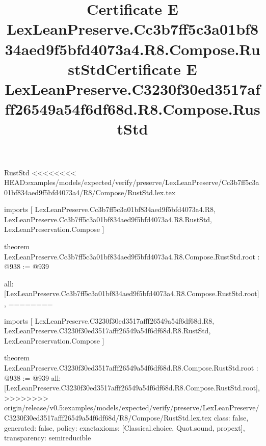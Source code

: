 \begin{lexlean}{RustStd}
<<<<<<<< HEAD:examples/models/expected/verify/preserve/LexLeanPreserve/Cc3b7ff5c3a01bf834aed9f5bfd4073a4/R8/Compose/RustStd.lex.tex
\title{Certificate E LexLeanPreserve.Cc3b7ff5c3a01bf834aed9f5bfd4073a4.R8.Compose.RustStd}
\begin{coremodule}
imports [
  LexLeanPreserve.Cc3b7ff5c3a01bf834aed9f5bfd4073a4.R8,
  LexLeanPreserve.Cc3b7ff5c3a01bf834aed9f5bfd4073a4.R8.RustStd,
  LexLeanPreservation.Compose
]

theorem LexLeanPreserve.Cc3b7ff5c3a01bf834aed9f5bfd4073a4.R8.Compose.RustStd.root : @938 := @939 {
  all: [LexLeanPreserve.Cc3b7ff5c3a01bf834aed9f5bfd4073a4.R8.Compose.RustStd.root],
========
\title{Certificate E LexLeanPreserve.C3230f30ed3517afff26549a54f6df68d.R8.Compose.RustStd}
\begin{coremodule}
imports [
  LexLeanPreserve.C3230f30ed3517afff26549a54f6df68d.R8,
  LexLeanPreserve.C3230f30ed3517afff26549a54f6df68d.R8.RustStd,
  LexLeanPreservation.Compose
]

theorem LexLeanPreserve.C3230f30ed3517afff26549a54f6df68d.R8.Compose.RustStd.root : @938 := @939 {
  all: [LexLeanPreserve.C3230f30ed3517afff26549a54f6df68d.R8.Compose.RustStd.root],
>>>>>>>> origin/release/v0.5:examples/models/expected/verify/preserve/LexLeanPreserve/C3230f30ed3517afff26549a54f6df68d/R8/Compose/RustStd.lex.tex
  class: false,
  generated: false,
  policy: exact{axioms: [Classical.choice, Quot.sound, propext]},
  transparency: semireducible
}


\end{coremodule}}
\end{coremodule}
\end{lexlean}
